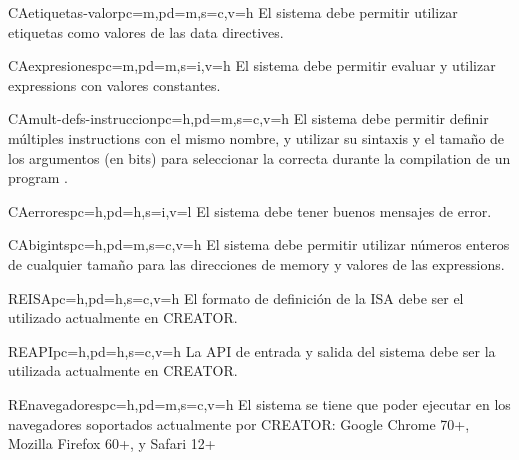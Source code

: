 \begin{userReq}{CA}{etiquetas-valor}{pc=m,pd=m,s=c,v=h}
    El sistema debe permitir utilizar etiquetas como valores de las \glspl{data directive}.
\end{userReq}

\begin{userReq}{CA}{expresiones}{pc=m,pd=m,s=i,v=h}
    El sistema debe permitir evaluar y utilizar \glspl{expression} con valores
    constantes.
\end{userReq}

\begin{userReq}{CA}{mult-defs-instruccion}{pc=h,pd=m,s=c,v=h}
    El sistema debe permitir definir múltiples \glspl{instruction} con el mismo
    nombre, y utilizar su sintaxis y el tamaño de los argumentos (en bits) para
    seleccionar la correcta durante la \gls{compilation} de un \gls{program}
    .
\end{userReq}

\begin{userReq}{CA}{errores}{pc=h,pd=h,s=i,v=l}
    El sistema debe tener buenos mensajes de error.
\end{userReq}

\begin{userReq}{CA}{bigints}{pc=h,pd=m,s=c,v=h}
    El sistema debe permitir utilizar números enteros de cualquier tamaño para
    las direcciones de \gls{memory} y valores de las \glspl{expression}.
\end{userReq}


\begin{userReq}{RE}{ISA}{pc=h,pd=h,s=c,v=h}
    El formato de definición de la \gls{ISA} debe ser el utilizado
    actualmente en CREATOR.
\end{userReq}

\begin{userReq}{RE}{API}{pc=h,pd=h,s=c,v=h}
    La \gls{API} de entrada y salida del sistema debe ser la utilizada
    actualmente en CREATOR.
\end{userReq}

\begin{userReq}{RE}{navegadores}{pc=h,pd=m,s=c,v=h}
    El sistema se tiene que poder ejecutar en los navegadores soportados
    actualmente por CREATOR: Google Chrome 70+, Mozilla Firefox 60+, y Safari
    12+
\end{userReq}

